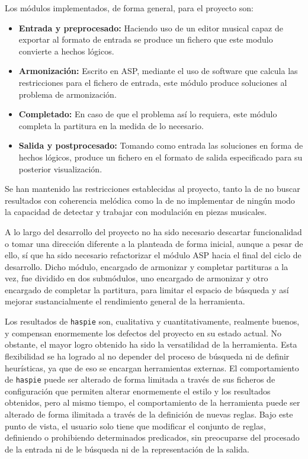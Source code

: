 Los módulos implementados, de forma general, para el proyecto son:
\begin{itemize}
	\item \textbf{Entrada y preprocesado:} Haciendo uso de un editor musical capaz de exportar al formato de entrada se produce un fichero que este modulo convierte a hechos lógicos.
	\item \textbf{Armonización:} Escrito en ASP, mediante el uso de software que calcula las restricciones para el fichero de entrada, este módulo produce soluciones al problema de armonización.
	\item \textbf{Completado:} En caso de que el problema así lo requiera, este módulo completa la partitura en la medida de lo necesario.
	\item \textbf{Salida y postprocesado:} Tomando como entrada las soluciones en forma de hechos lógicos, produce un fichero en el formato de salida especificado para su posterior visualización.
\end{itemize}

Se han mantenido las restricciones establecidas al proyecto, tanto la de no buscar resultados con coherencia melódica como la de no implementar de ningún modo la capacidad de detectar y trabajar con modulación en piezas musicales. 

A lo largo del desarrollo del proyecto no ha sido necesario descartar funcionalidad o tomar una dirección diferente a la planteada de forma inicial, aunque a pesar de ello, sí que ha sido necesario refactorizar el módulo ASP hacia el final del ciclo de desarrollo. Dicho módulo, encargado de armonizar y completar partituras a la vez, fue dividido en dos submódulos, uno encargado de armonizar y otro encargado de completar la partitura, para limitar el espacio de búsqueda y así mejorar sustancialmente el rendimiento general de la herramienta.

Los resultados de \texttt{haspie} son, cualitativa y cuantitativamente, realmente buenos, y compensan enormemente los defectos del proyecto en su estado actual. No obstante, el mayor logro obtenido ha sido la versatilidad de la herramienta. Esta flexibilidad se ha logrado al no depender del proceso de búsqueda ni de definir heurísticas, ya que de eso se encargan herramientas externas. El comportamiento de \texttt{haspie} puede ser alterado de forma limitada a través de sus ficheros de configuración que permiten alterar enormemente el estilo y los resultados obtenidos, pero al mismo tiempo, el comportamiento de la herramienta puede ser alterado de forma ilimitada a través de la definición de nuevas reglas. Bajo este punto de vista, el usuario solo tiene que modificar el conjunto de reglas, definiendo o prohibiendo determinados predicados, sin preocuparse del procesado de la entrada ni de le búsqueda ni de la representación de la salida.

